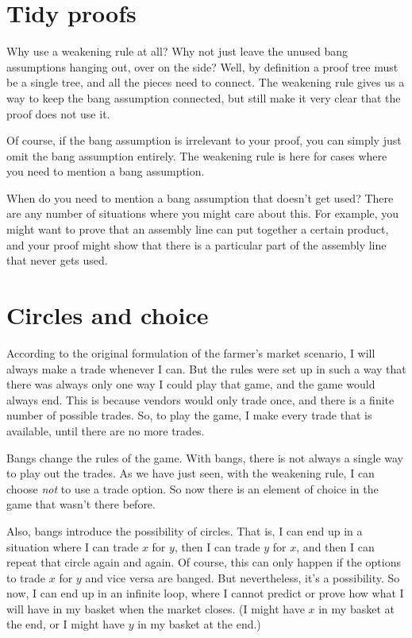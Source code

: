 \documentclass[../../../main.tex]{subfiles}
\begin{document}
\section{Tidy proofs}

Why use a weakening rule at all? Why not just leave the unused bang assumptions hanging out, over on the side? Well, by definition a proof tree must be a single tree, and all the pieces need to connect. The weakening rule gives us a way to keep the bang assumption connected, but still make it very clear that the proof does not use it.

Of course, if the bang assumption is irrelevant to your proof, you can simply just omit the bang assumption entirely. The weakening rule is here for cases where you need to mention a bang assumption.

When do you need to mention a bang assumption that doesn't get used? There are any number of situations where you might care about this. For example, you might want to prove that an assembly line can put together a certain product, and your proof might show that there is a particular part of the assembly line that never gets used. 


\section{Circles and choice}

According to the original formulation of the farmer's market scenario, I will always make a trade whenever I can. But the rules were set up in such a way that there was always only one way I could play that game, and the game would always end. This is because vendors would only trade once, and there is a finite number of possible trades. So, to play the game, I make every trade that is available, until there are no more trades.

Bangs change the rules of the game. With bangs, there is not always a single way to play out the trades. As we have just seen, with the weakening rule, I can choose \emph{not} to use a trade option. So now there is an element of choice in the game that wasn't there before.

Also, bangs introduce the possibility of circles. That is, I can end up in a situation where I can trade $x$ for $y$, then I can trade $y$ for $x$, and then I can repeat that circle again and again. Of course, this can only happen if the options to trade $x$ for $y$ and vice versa are banged. But nevertheless, it's a possibility. So now, I can end up in an infinite loop, where I cannot predict or prove how what I will have in my basket when the market closes. (I might have $x$ in my basket at the end, or I might have $y$ in my basket at the end.)
\end{document}
